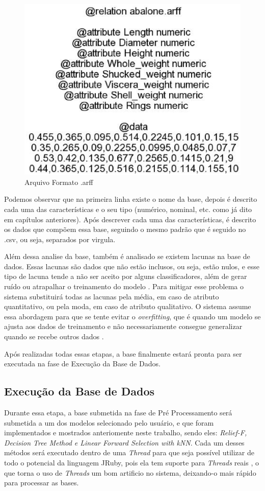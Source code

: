 \begin{figure}[H]
	\centering
	\label{fig15}
		\includegraphics[keepaspectratio=true,scale=0.5]{figuras/fig16.eps}
	\caption{Arquivo Formato .arff}
\end{figure}

Podemos observar que na primeira linha existe o nome da base, depois é descrito cada uma das características e o seu tipo (numérico, nominal, etc. como já dito em capítulos anteriores). Após descrever cada uma das características, é descrito os dados que compõem essa base, seguindo o mesmo padrão que é seguido no .csv, ou seja, separados por virgula.

Além dessa analise da base, também é analisado se existem lacunas na base de dados. Essas lacunas são dados que não estão inclusos, ou seja, estão nulos, e esse tipo de lacuna tende a não ser aceito por alguns classificadores, além de gerar ruído ou atrapalhar o treinamento do modelo \cite{labic_2002}. Para mitigar esse problema o sistema substituirá todas as lacunas pela média, em caso de atributo quantitativo, ou pela moda, em caso de atributo qualitativo. O sistema assume essa abordagem para que se tente evitar o \textit{overfitting}, que é quando um modelo se ajusta aos dados de treinamento e não necessariamente consegue generalizar quando se recebe outros dados \cite{hawkins_2002}.

Após realizadas todas essas etapas, a base finalmente estará pronta para ser executada na fase de Execução da Base de Dados.


\subsection{Execução da Base de Dados}
Durante essa etapa, a base submetida na fase de Pré Processamento será submetida a um dos modelos selecionado pelo usuário, e que foram implementados e mostrados anteriomente neste trabalho, sendo eles: \textit{Relief-F, Decision Tree Method e Linear Forward Selection with kNN}. Cada um desses métodos será executado dentro de uma \textit{Thread} para que seja possível utilizar de todo o potencial da linguagem JRuby, pois ela tem suporte para \textit{Threads} reais \cite{jruby}, o que torna o uso de \textit{Threads} um bom artificio no sistema, deixando-o mais rápido para processar as bases.
